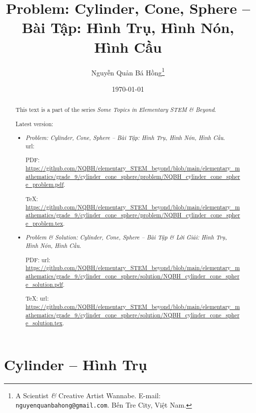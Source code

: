 \documentclass{article}
\title{Problem: Cylinder, Cone, Sphere -- Bài Tập: Hình Trụ, Hình Nón, Hình Cầu}
\author{Nguyễn Quản Bá Hồng\footnote{A Scientist {\it\&} Creative Artist Wannabe. E-mail: {\tt nguyenquanbahong@gmail.com}. Bến Tre City, Việt Nam.}}
\date{\today}
\begin{document}
\maketitle
\begin{abstract}
	This text is a part of the series {\it Some Topics in Elementary STEM \& Beyond}.
	
	Latest version:
	\begin{itemize}
		\item {\it Problem: Cylinder, Cone, Sphere -- Bài Tập: Hình Trụ, Hình Nón, Hình Cầu}.\\{\sc url}:
		
		PDF: \url{https://github.com/NQBH/elementary_STEM_beyond/blob/main/elementary_mathematics/grade_9/cylinder_cone_sphere/problem/NQBH_cylinder_cone_sphere_problem.pdf}.
		
		\TeX: \url{https://github.com/NQBH/elementary_STEM_beyond/blob/main/elementary_mathematics/grade_9/cylinder_cone_sphere/problem/NQBH_cylinder_cone_sphere_problem.tex}.
		\item {\it Problem \& Solution: Cylinder, Cone, Sphere -- Bài Tập \& Lời Giải: Hình Trụ, Hình Nón, Hình Cầu}.
		
		PDF: {\sc url}: \url{https://github.com/NQBH/elementary_STEM_beyond/blob/main/elementary_mathematics/grade_9/cylinder_cone_sphere/solution/NQBH_cylinder_cone_sphere_solution.pdf}.
		
		\TeX: {\sc url}: \url{https://github.com/NQBH/elementary_STEM_beyond/blob/main/elementary_mathematics/grade_9/cylinder_cone_sphere/solution/NQBH_cylinder_cone_sphere_solution.tex}.
	\end{itemize}
\end{abstract}
\tableofcontents


\section{Cylinder -- Hình Trụ}
\end{document}
